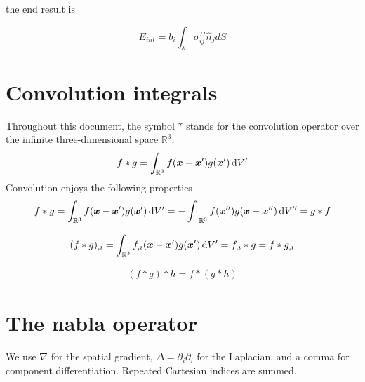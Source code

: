 the end result is

\begin{equation}
E_{int}=b_i\int_\mathcal{S} \sigma^{II}_{ij}\hat{n}_jdS
\end{equation}


%



%






\section{Convolution integrals}
Throughout this document, the symbol $*$ stands for the convolution operator over the infinite three-dimensional space $\mathbb{R}^3$:
\begin{align}
f*g=\int_{\mathbb{R}^3}f(\bm x-\bm x')g(\bm x')\,\text{d}V'
\end{align}
Convolution enjoys the following properties
\begin{align}
f*g=\int_{\mathbb{R}^3}f(\bm x-\bm x')g(\bm x')\,\text{d}V'=-\int_{-\mathbb{R}^3}f(\bm x'')g(\bm x-\bm x'')\,\text{d}V''=g*f
\end{align}

\begin{align}
(f*g)_{,i}=\int_{\mathbb{R}^3}f_{,i}(\bm x-\bm x')g(\bm x')\,\text{d}V'=f_{,i}*g=f*g_{,i}
\end{align}

\begin{align}
(f*g)*h=f*(g*h)
\end{align}

\section{The nabla operator}
We use $\nabla$ for the spatial gradient, $\Delta=\partial_i\partial_i$ for the Laplacian, and a comma for component differentiation. Repeated Cartesian indices are summed.


